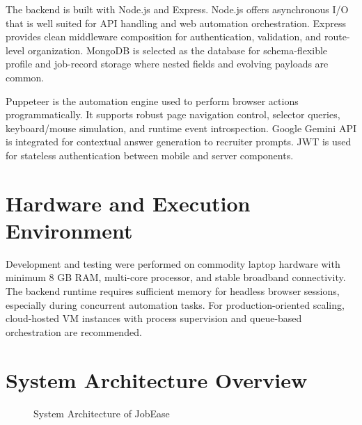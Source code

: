 \documentclass[12pt,a4paper,oneside]{report}
\begin{document}
The backend is built with Node.js and Express. Node.js offers asynchronous I/O that is well suited for API handling and web automation orchestration. Express provides clean middleware composition for authentication, validation, and route-level organization. MongoDB is selected as the database for schema-flexible profile and job-record storage where nested fields and evolving payloads are common.

Puppeteer is the automation engine used to perform browser actions programmatically. It supports robust page navigation control, selector queries, keyboard/mouse simulation, and runtime event introspection. Google Gemini API is integrated for contextual answer generation to recruiter prompts. JWT is used for stateless authentication between mobile and server components.

\section{Hardware and Execution Environment}
Development and testing were performed on commodity laptop hardware with minimum 8 GB RAM, multi-core processor, and stable broadband connectivity. The backend runtime requires sufficient memory for headless browser sessions, especially during concurrent automation tasks. For production-oriented scaling, cloud-hosted VM instances with process supervision and queue-based orchestration are recommended.

\section{System Architecture Overview}
\begin{figure}[H]
\centering
{}
\caption{System Architecture of JobEase}
\end{figure}
\end{document}
